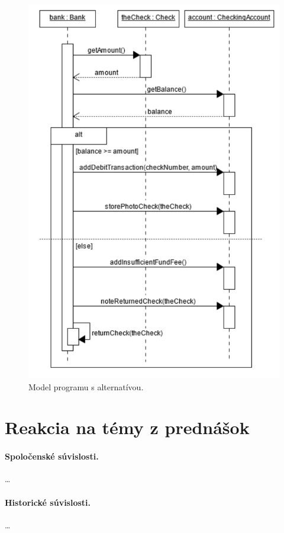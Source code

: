 \documentclass[10pt,slovak,a4paper]{article}
\begin{document}
\begin{figure}[tbh]
\centering
\includegraphics[scale=0.8]{cond_diag.pdf}
\caption{Model programu s alternatívou. \cite{booch00}}
\label{diag2}
\end{figure}

\section{Reakcia na témy z prednášok}
\paragraph{Spoločenské súvislosti.}
\ldots

\paragraph{Historické súvislosti.}
\ldots
\end{document}
